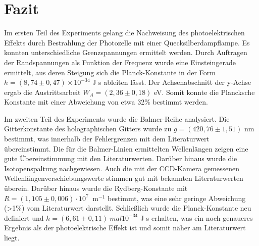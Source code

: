 \chapter{Fazit}

Im ersten Teil des Experiments gelang die Nachweisung des photoelektrischen Effekts durch Bestrahlung der Photozelle mit einer Quecksilberdampflampe. Es konnten unterschiedliche Grenzspannungen ermittelt werden. Durch Auftragen der Randspannungen als Funktion der Frequenz wurde eine Einsteingerade ermittelt, aus deren Steigung sich die Planck-Konstante in der Form \( h = ( 8,74\pm 0,47) \times 10^{-34} \) J s ableiten lässt. Der Achsenabschnitt der y-Achse ergab die Austrittsarbeit \( W_A = ( 2,36\pm 0,18 ) \) eV. Somit konnte die Plancksche Konstante mit einer Abweichung von etwa 32\% bestimmt werden.

Im zweiten Teil des Experiments wurde die Balmer-Reihe analysiert. Die Gitterkonstante des holographischen Gitters wurde zu \(g = ( 420,76 \pm 1,51) \) nm bestimmt, was innerhalb der Fehlergrenzen mit dem Literaturwert übereinstimmt. Die für die Balmer-Linien ermittelten Wellenlängen zeigen eine gute Übereinstimmung mit den Literaturwerten. Darüber hinaus wurde die Isotopenspaltung nachgewiesen. Auch die mit der CCD-Kamera gemessenen Wellenlängenverschiebungswerte stimmen gut mit bekannten Literaturwerten überein. Darüber hinaus wurde die Rydberg-Konstante mit \(R = ( 1,105 \pm 0,006) \cdot 10^{7}\ \) m\(^{-1}\) bestimmt, was eine sehr geringe Abweichung (>1\%) vom Literaturwert darstellt. Schließlich wurde die Planck-Konstante neu definiert und \( h = (6,61 \pm 0,11 ) \ mal 10^{-34} \) J s erhalten, was ein noch genaueres Ergebnis als der photoelektrische Effekt ist und somit näher am Literaturwert liegt.